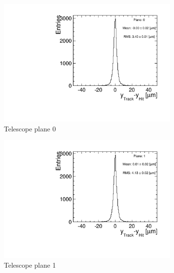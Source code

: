\begin{figure}[htbp] \centering
  \begin{subfigure}[b]{0.3\textwidth}
    \includegraphics[width=\textwidth]{figures/Telescope/biasedResiduals/BiasedResiduals_run77_PlaneYRMS0.pdf}
    \caption{Telescope plane 0}
  \end{subfigure}\hfill
  \begin{subfigure}[b]{0.3\textwidth}
    \includegraphics[width=\textwidth]{figures/Telescope/biasedResiduals/BiasedResiduals_run77_PlaneYRMS1.pdf}
    \caption{Telescope plane 1}
  \end{subfigure}\hfill
  \begin{subfigure}[b]{0.3\textwidth}

\end{subfigure}
\end{figure}
